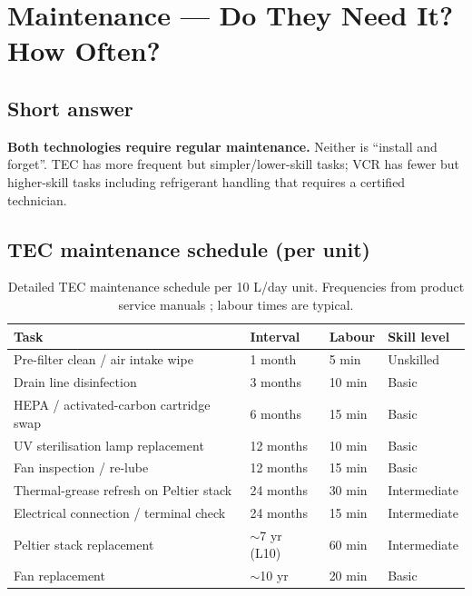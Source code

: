\documentclass[11pt,a4paper]{article}
\begin{document}
\section{Maintenance --- Do They Need It? How Often?}
\label{sec:maintenance}

\subsection{Short answer}
\textbf{Both technologies require regular maintenance.} Neither is ``install and forget''. TEC has more frequent but simpler/lower-skill tasks; VCR has fewer but higher-skill tasks including refrigerant handling that requires a certified technician.

\subsection{TEC maintenance schedule (per unit)}
\begin{table}[h]
\centering\small
\caption{Detailed TEC maintenance schedule per 10 L/day unit. Frequencies from product service manuals \citep{ecoloblue2024,peltier_handbook_2018}; labour times are typical.}
\label{tab:tec_maint}
\begin{tabular}{@{}llll@{}}
\toprule
\textbf{Task} & \textbf{Interval} & \textbf{Labour} & \textbf{Skill level}\\
\midrule
Pre-filter clean / air intake wipe              & 1 month & 5 min  & Unskilled \\
Drain line disinfection                          & 3 months & 10 min & Basic \\
HEPA / activated-carbon cartridge swap           & 6 months & 15 min & Basic \\
UV sterilisation lamp replacement                & 12 months & 10 min & Basic \\
Fan inspection / re-lube                         & 12 months & 15 min & Basic \\
Thermal-grease refresh on Peltier stack          & 24 months & 30 min & Intermediate \\
Electrical connection / terminal check           & 24 months & 15 min & Intermediate \\
Peltier stack replacement                        & $\sim$7 yr (L10) & 60 min & Intermediate \\
Fan replacement                                  & $\sim$10 yr & 20 min & Basic \\
\bottomrule
\end{tabular}
\end{table}
\end{document}
